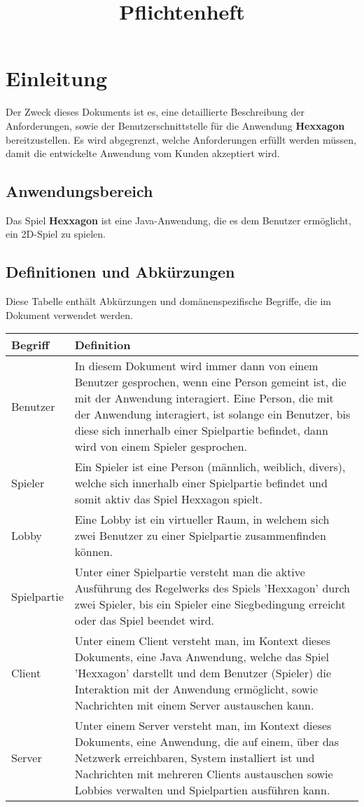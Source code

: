 \documentclass{uulm-assignment}
\title{Pflichtenheft}
\begin{document}
\maketitle

\section{Einleitung}

Der Zweck dieses Dokuments ist es, eine detaillierte Beschreibung der Anforderungen, sowie der
Benutzerschnittstelle für die Anwendung \textbf{Hexxagon} bereitzustellen. Es wird abgegrenzt, welche
Anforderungen erfüllt werden müssen, damit die entwickelte Anwendung vom Kunden akzeptiert
wird.

\subsection{Anwendungsbereich}

Das Spiel \textbf{Hexxagon} ist eine Java-Anwendung, die es dem Benutzer ermöglicht, ein 2D-Spiel zu spielen.

\subsection{Definitionen und Abkürzungen}

Diese Tabelle enthält Abkürzungen und domänenspezifische Begriffe, die im Dokument verwendet
werden.

\begin{tabularx}{16cm}{l|X}
\textbf{Begriff} & \textbf{Definition} \\
\hline
Benutzer & In diesem Dokument wird immer dann von einem Benutzer gesprochen, wenn eine Person gemeint ist, die mit der Anwendung interagiert. Eine Person, die mit der Anwendung interagiert, ist solange ein Benutzer, bis diese sich innerhalb einer Spielpartie befindet, dann wird von einem Spieler gesprochen.\\
\hline
Spieler & Ein Spieler ist eine Person (männlich, weiblich, divers), welche sich innerhalb einer Spielpartie befindet und somit aktiv das Spiel Hexxagon spielt. \\
\hline
Lobby & Eine Lobby ist ein virtueller Raum, in welchem sich zwei Benutzer zu einer Spielpartie zusammenfinden können. \\
\hline
Spielpartie & Unter einer Spielpartie versteht man die aktive Ausführung des Regelwerks des Spiels 'Hexxagon' durch zwei Spieler, bis ein Spieler eine Siegbedingung erreicht oder das Spiel beendet wird. \\
\hline
Client & Unter einem Client versteht man, im Kontext dieses Dokuments, eine Java Anwendung, welche das Spiel 'Hexxagon' darstellt und dem Benutzer (Spieler) die Interaktion mit der Anwendung ermöglicht, sowie Nachrichten mit einem Server austauschen kann. \\
\hline
Server & Unter einem Server versteht man, im Kontext dieses Dokuments, eine Anwendung, die auf einem, über das Netzwerk erreichbaren, System installiert ist und Nachrichten mit mehreren Clients austauschen sowie Lobbies verwalten und Spielpartien ausführen kann. \\
\end{tabularx}
\end{document}
